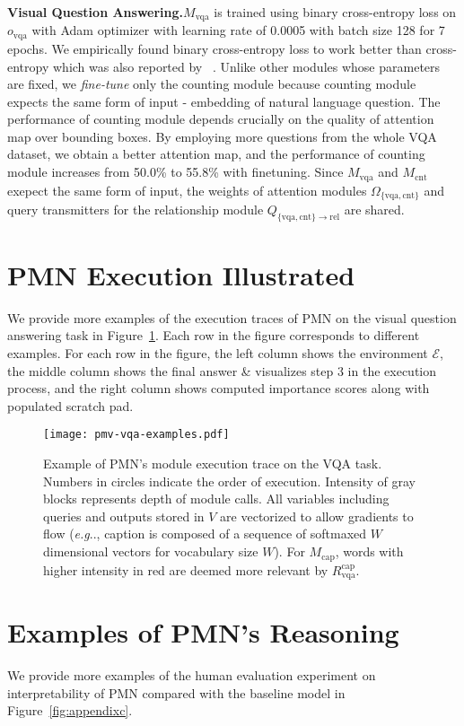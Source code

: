 \documentclass{article}
\makeatletter
\def\PMN{PMN}
\def\E{\mathcal{E}}
\def\Mcnt{M_\mathrm{cnt}}
\def\Mcap{M_\mathrm{cap}}
\def\Mvqa{M_\mathrm{vqa}}
\DeclareRobustCommand\onedot{\futurelet\@let@token\@onedot}
\def\@onedot{\ifx\@let@token.\else.\null\fi\xspace}
\def\eg{\emph{e.g}\onedot} \def\Eg{\emph{E.g}\onedot}
\makeatother
\begin{document}
\textbf{Visual Question Answering.}$\Mvqa$ is trained using binary cross-entropy loss on $o_\mathrm{vqa}$ with Adam optimizer with learning rate of 0.0005 with batch size 128 for 7 epochs. We empirically found binary cross-entropy loss to work better than cross-entropy which was also reported by ~\cite{anderson17}.
Unlike other modules whose parameters are fixed, we \emph{fine-tune} only the counting module because counting module expects the same form of input - embedding of natural language question.
The performance of counting module depends crucially on the quality of attention map over bounding boxes.
By employing more questions from the whole VQA dataset, we obtain a better attention map, and the performance of counting module increases from 50.0\% to 55.8\% with finetuning.
Since $\Mvqa$ and $\Mcnt$ exepect the same form of input, the weights of attention modules $\Omega_\mathrm{\{vqa,cnt\}}$ and query transmitters for the relationship module $Q_\mathrm{\{vqa,cnt\} \rightarrow rel}$ are shared.

\newpage\section{PMN Execution Illustrated}\label{sec:appendix_pmn_exec}
We provide more examples of the execution traces of PMN on the visual question answering task in Figure~\ref{fig:appendixb2}.
Each row in the figure corresponds to different examples. For each row in the figure, the left column shows the environment $\E$, the middle column shows the final answer \& visualizes step 3 in the execution process, and
the right column shows computed importance scores along with populated scratch pad.
\begin{figure}[!htb]
\texttt{[image: pmv-vqa-examples.pdf]}
\vspace{-15mm}
\caption{
\small Example of \PMN's module execution trace on the VQA task.
Numbers in circles indicate the order of execution.
Intensity of gray blocks represents depth of module calls.
All variables including queries and outputs stored in $V$ are vectorized to allow gradients to flow
(\eg, caption is composed of a sequence of softmaxed $W$ dimensional vectors for vocabulary size $W$).
For $\Mcap$, words with higher intensity in red are deemed more relevant by $R_\mathrm{vqa}^\mathrm{cap}$.
}
\label{fig:appendixb2}
\vspace{-2mm}
\end{figure}\newpage\section{Examples of PMN's Reasoning}\label{sec:appendix_pmn_reasoning}
We provide more examples of the human evaluation experiment on interpretability of PMN compared with the baseline model in Figure~\ref{fig:appendixc}.
\end{document}

